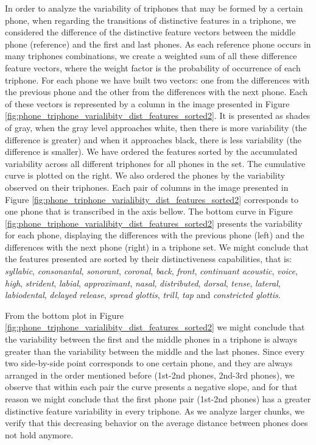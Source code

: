 In order to analyze the variability of triphones that may be formed by a certain phone, 
when regarding the transitions of distinctive features in a triphone, we 
considered the difference of the distinctive feature vectors between the middle phone
(reference) and the first and last phones. As each reference phone occurs in many
triphones combinations, we create a weighted sum of all these difference feature vectors, 
where the weight factor is the probability of occurrence of each triphone. For each
phone we have built two vectors: one from the differences with the previous phone
and the other from the differences with the next phone.
Each of these vectors is represented by a column in the image presented
in Figure \ref{fig:phone_triphone_varialibity_dist_features_sorted2}.
It is presented as shades of gray, when the gray level approaches white,
then there is more variability (the difference is greater) and when it approaches
black, there is less variability (the difference is smaller).
We have ordered the features sorted by the accumulated variability across 
all different triphones for all phones in the set. The cumulative curve is plotted on the right. 
We also ordered the phones
by the variability observed on their triphones. Each pair of columns 
in the image presented in Figure \ref{fig:phone_triphone_varialibity_dist_features_sorted2}
corresponds to one phone that is transcribed in the axis bellow.
The bottom curve in Figure \ref{fig:phone_triphone_varialibity_dist_features_sorted2}
presents the variability for each phone, 
displaying
the differences with the previous phone (left) and the differences with
the next phone (right) in a triphone set.
We might conclude that the features presented are sorted by their distinctiveness 
capabilities, that is: \textit{syllabic}, \textit{consonantal}, \textit{sonorant}, \textit{coronal}, 
\textit{back}, \textit{front}, \textit{continuant acoustic}, \textit{voice}, \textit{high}, 
\textit{strident}, \textit{labial}, \textit{approximant}, \textit{nasal}, \textit{distributed},
\textit{dorsal}, \textit{tense}, \textit{lateral}, \textit{labiodental}, \textit{delayed release}, 
\textit{spread glottis}, \textit{trill}, \textit{tap} and \textit{constricted glottis}.


From the bottom plot in Figure \ref{fig:phone_triphone_varialibity_dist_features_sorted2}
we might conclude that the variability between the first and the middle phones in a triphone
is always greater than the variability between the middle and the last phones.
Since every two side-by-side point corresponds to one certain phone, and they are always arranged 
in the order mentioned before (1st-2nd phones, 2nd-3rd phones), 
we observe that within each pair the curve presents a negative slope,
and for that reason we might conclude that the first phone pair (1st-2nd phones) has a greater distinctive
feature variability in every triphone.
As we analyze larger chunks, we verify that this decreasing behavior on the average distance
between phones does not hold anymore.

